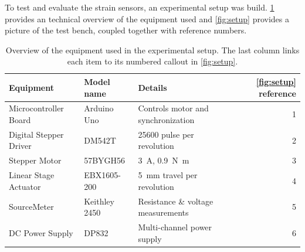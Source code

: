 To test and evaluate the strain sensors, an experimental setup was build. \cref{tab:setup} provides an technical overview of the equipment used and \cref{fig:setup} provides a picture of the test bench, coupled together with reference numbers. 

\begin{table}[!b]
\centering
\caption{Overview of the equipment used in the experimental setup. The last column links each item to its numbered callout in \cref{fig:setup}.}
\label{tab:setup}
\small
\setlength{\tabcolsep}{6pt}
\begin{tabularx}{\textwidth}{@{}l l X r@{}}
\toprule
Equipment & Model name & Details & \cref{fig:setup} reference\\
\midrule
Microcontroller Board & Arduino Uno & Controls motor and synchronization & 1 \\
Digital Stepper Driver & DM542T & 25600 pulse per revolution & 2 \\
Stepper Motor & 57BYGH56 & \SI{3}{\ampere}, \SI{0.9}{\newton\meter} & 3 \\
Linear Stage Actuator & EBX1605-200 & \SI{5}{\milli\meter} travel per revolution & 4 \\
SourceMeter & Keithley 2450 & Resistance \& voltage measurements & 5 \\
DC Power Supply & DP832 & Multi-channel power supply & 6 \\
\bottomrule
\end{tabularx}
\end{table}

